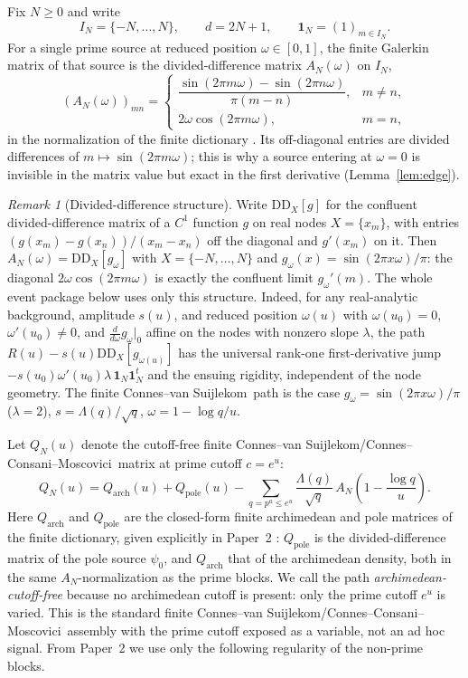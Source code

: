\documentclass[11pt]{article}
\theoremstyle{plain}
\theoremstyle{definition}
\theoremstyle{remark}
\newtheorem{remark}[theorem]{Remark}
\newcommand{\cvs}{Connes--van Suijlekom}
\newcommand{\ccm}{Connes--Consani--Moscovici}
\newcommand{\one}{\mathbf 1}
\newcommand{\Lam}{\Lambda}
\begin{document}
Fix $N\ge0$ and write
\[
        I_N=\{-N,\ldots,N\},\qquad d=2N+1,\qquad
        \one_N=(1)_{m\in I_N}.
\]
For a single prime source at reduced position $\omega\in[0,1]$, the finite
Galerkin matrix of that source is the divided-difference matrix $A_N(\omega)$ on
$I_N$,
\[
 (A_N(\omega))_{mn}=
 \begin{cases}
 \dfrac{\sin(2\pi m\omega)-\sin(2\pi n\omega)}{\pi(m-n)},&m\ne n,\\[1.2ex]
 2\omega\cos(2\pi m\omega),&m=n,
 \end{cases}
\]
in the normalization of the finite dictionary \cite{Groskin2026FiniteDictionary}.
Its off-diagonal entries are divided differences of $m\mapsto\sin(2\pi m\omega)$;
this is why a source entering at $\omega=0$ is invisible in the matrix value but
exact in the first derivative (Lemma~\ref{lem:edge}).

\begin{remark}[Divided-difference structure]\label{rem:dd}
Write $\mathrm{DD}_X[g]$ for the confluent divided-difference matrix of a $C^1$
function $g$ on real nodes $X=\{x_m\}$, with entries
$(g(x_m)-g(x_n))/(x_m-x_n)$ off the diagonal and $g'(x_m)$ on it. Then
$A_N(\omega)=\mathrm{DD}_X[g_\omega]$ with $X=\{-N,\dots,N\}$ and
$g_\omega(x)=\sin(2\pi x\omega)/\pi$: the diagonal $2\omega\cos(2\pi m\omega)$ is
exactly the confluent limit $g_\omega'(m)$. The whole event package below uses
only this structure. Indeed, for any real-analytic background, amplitude
$s(u)$, and reduced position $\omega(u)$ with $\omega(u_0)=0$,
$\omega'(u_0)\ne0$, and $\tfrac{d}{d\omega}g_\omega|_0$ affine on the nodes with
nonzero slope $\lambda$, the path $R(u)-s(u)\mathrm{DD}_X[g_{\omega(u)}]$ has the
universal rank-one first-derivative jump $-s(u_0)\omega'(u_0)\lambda\,
\one_N\one_N^t$ and the ensuing rigidity, independent of the node geometry. The
finite \cvs\ path is the case $g_\omega=\sin(2\pi x\omega)/\pi$ ($\lambda=2$),
$s=\Lam(q)/\sqrt q$, $\omega=1-\log q/u$.
\end{remark}

Let $Q_N(u)$ denote the cutoff-free finite \cvs/\ccm\ matrix at prime cutoff
$c=e^u$:
\[
        Q_N(u)=Q_{\mathrm{arch}}(u)+Q_{\mathrm{pole}}(u)
        -\sum_{q=p^a\le e^u}\frac{\Lam(q)}{\sqrt q}\,
             A_N\!\left(1-\frac{\log q}{u}\right).
\]
Here $Q_{\mathrm{arch}}$ and $Q_{\mathrm{pole}}$ are the closed-form finite
archimedean and pole matrices of the finite dictionary, given explicitly in
Paper~2 \cite[the finite archimedean and pole blocks]{Groskin2026FiniteDictionary}:
$Q_{\mathrm{pole}}$ is the divided-difference matrix of the pole source
$\psi_0$, and $Q_{\mathrm{arch}}$ that of the archimedean density, both in the
same $A_N$-normalization as the prime blocks. We call the path
\emph{archimedean-cutoff-free} because no archimedean cutoff is present: only the
prime cutoff $e^u$ is varied. This is the standard finite \cvs/\ccm\ assembly
with the prime cutoff exposed as a variable, not an ad hoc signal. From Paper~2
we use only the following regularity of the non-prime blocks.
\end{document}
